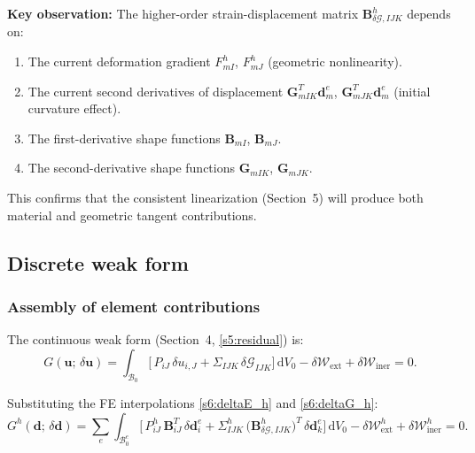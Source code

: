 \documentclass[11pt]{article}
\begin{document}
\textbf{Key observation:} The higher-order strain-displacement matrix
$\mathbf{B}_{\delta\mathcal{G},IJK}^{h}$ depends on:
\begin{enumerate}
\item The current deformation gradient $F_{mI}^{h}$, $F_{mJ}^{h}$
  (geometric nonlinearity).
\item The current second derivatives of displacement
  $\mathbf{G}_{mIK}^{T}\mathbf{d}_{m}^{e}$, $\mathbf{G}_{mJK}^{T}\mathbf{d}_{m}^{e}$
  (initial curvature effect).
\item The first-derivative shape functions $\mathbf{B}_{mI}$, $\mathbf{B}_{mJ}$.
\item The second-derivative shape functions $\mathbf{G}_{mIK}$, $\mathbf{G}_{mJK}$.
\end{enumerate}

This confirms that the consistent linearization (Section~5) will produce
both material and geometric tangent contributions.

\subsection{Discrete weak form}
\label{ssec:discrete_weak}

\subsubsection{Assembly of element contributions}

The continuous weak form (Section~4, \eqref{s5:residual}) is:
\begin{equation}
G(\mathbf{u};\,\delta\mathbf{u})
= \int_{\mathcal{B}_{0}}
  \bigl[\,P_{iJ}\,\delta u_{i,J}
  + \Sigma_{IJK}\,\delta\mathcal{G}_{IJK}\bigr]\,
  \mathrm{d}V_{0}
- \delta\mathcal{W}_{\mathrm{ext}}
+ \delta\mathcal{W}_{\mathrm{iner}}
= 0.
\end{equation}

Substituting the FE interpolations \eqref{s6:deltaE_h} and
\eqref{s6:deltaG_h}:
\begin{equation}
G^{h}(\mathbf{d};\,\delta\mathbf{d})
= \sum_{e}\int_{\mathcal{B}_{0}^{e}}
  \bigl[\,P_{iJ}^{h}\,\mathbf{B}_{iJ}^{T}\,\delta\mathbf{d}_{i}^{e}
  + \Sigma_{IJK}^{h}\,\bigl(\mathbf{B}_{\delta\mathcal{G},IJK}^{h}\bigr)^{T}\,\delta\mathbf{d}_{k}^{e}
  \bigr]\,\mathrm{d}V_{0}
- \delta\mathcal{W}_{\mathrm{ext}}^{h}
+ \delta\mathcal{W}_{\mathrm{iner}}^{h}
= 0.
\end{equation}
\end{document}
